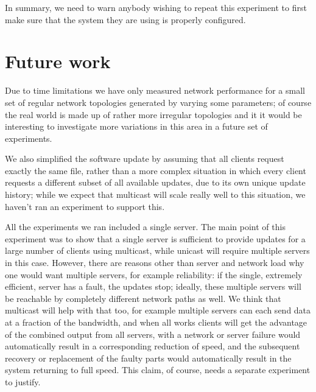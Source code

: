\documentclass[a4paper,12pt]{article}
\begin{document}
In summary, we need to warn anybody wishing to repeat this experiment
to first make sure that the system they are using is properly
configured.

\section{Future work}
\label{future}

Due to time limitations we have only measured network performance
for a small set of regular network topologies generated by varying
some parameters; of course the real world is made up of rather
more irregular topologies and it it would be interesting to investigate
more variations in this area in a future set of experiments.

We also simplified the software update by assuming that all clients
request exactly the same file, rather than a more complex situation
in which every client requests a different subset of all available
updates, due to its own unique update history; while we expect that
multicast will scale really well to this situation, we haven't
ran an experiment to support this.

All the experiments we ran included a single server.  The main point
of this experiment was to show that a single server is sufficient to
provide updates for a large number of clients using multicast, while
unicast will require multiple servers in this case.  However, there
are reasons other than server and network load why one would want
multiple servers, for example reliability: if the single, extremely
efficient, server has a fault, the updates stop; ideally, these
multiple servers will be reachable by completely different network
paths as well.  We think that multicast will help with that too,
for example multiple servers can each send data at a fraction of the
bandwidth, and when all works clients will get the advantage of the
combined output from all servers, with a network or server failure
would automatically result in a corresponding reduction of speed, and
the subsequent recovery or replacement of the faulty parts would
automatically result in the system returning to full speed.  This
claim, of course, needs a separate experiment to justify.
\end{document}
